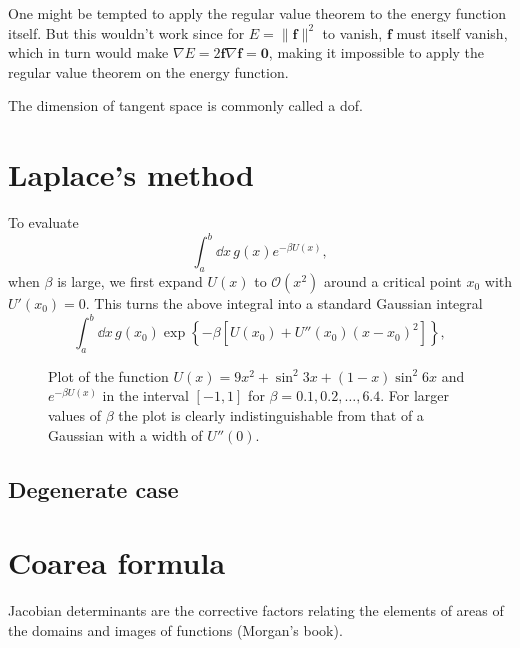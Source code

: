 One might be tempted to apply the regular value theorem to the energy function itself.
But this wouldn't work since for $E=\|\bm{f}\|^2$ to vanish, $\bm{f}$ must itself vanish, which in turn would make $\nabla E = 2 \bm{f}\nabla\bm{f} = \bm{0}$, making it impossible to apply the regular value theorem on the energy function.

The dimension of tangent space is commonly called a \ac{dof}.

\begin{theorem}
\end{theorem}

\section{Laplace's method}

To evaluate
%
\begin{equation}
  \int_{a}^{b} \dd{x}\, g(x) e^{-\beta U(x)},
\end{equation}
when $\beta$ is large, we first expand $U(x)$ to $\mathcal{O}(x^{2})$ around a critical point $x_{0}$ with $U'(x_{0}) = 0$.
This turns the above integral into a standard Gaussian integral
%
\begin{equation}
  \int_{a}^{b} \dd{x}\, g(x_{0}) \exp\left\{-\beta\left[U(x_{0}) +  U''(x_{0})(x-x_{0})^{2}\right]\right\},
\end{equation}

\begin{figure}
  \caption{Plot of the function $U(x) = 9x^{2} + \sin^{2}{3x} + (1-x)\sin^{2}{6x}$ and $e^{-\beta U(x)}$ in the interval $[-1,1]$ for $\beta = 0.1, 0.2, \ldots, 6.4$.  For larger values of $\beta$ the plot is clearly indistinguishable from that of a Gaussian with a width of $U''(0)$.}
  \label{fig:}
\end{figure}

\subsection{Degenerate case}

\section{Coarea formula}

Jacobian determinants are the corrective factors relating the elements of areas of the domains and images of functions (Morgan's book).

